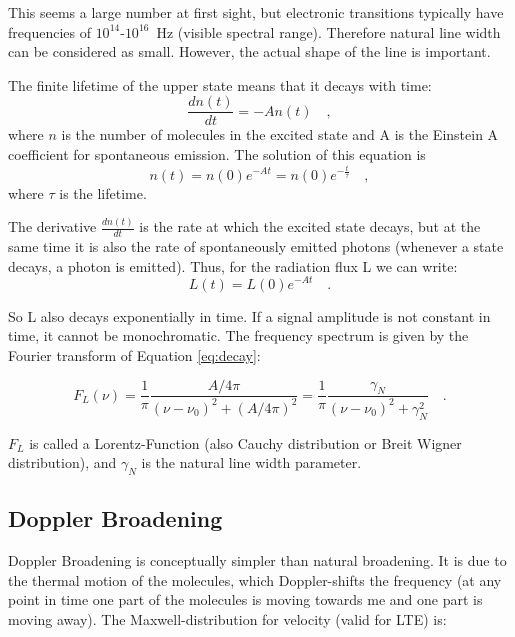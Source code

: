 This seems a large number at first sight, but electronic transitions
typically have frequencies of $10^{14}$-$10^{16}$~Hz (visible spectral
range). Therefore natural line width can be considered as
small. However, the actual shape of the line is important.

The finite lifetime of the upper state means that it decays with time:
\begin{equation}
\frac{dn(t)}{dt} = -A n(t) \quad ,
\end{equation}
where $n$ is the number of molecules in the excited state and A is the
Einstein A coefficient for spontaneous emission. The solution of this
equation is
\begin{equation}
n(t) = n(0) e^{-At} = n(0) e^{-\frac{t}{\tau}} \quad ,
\end{equation}
where $\tau$ is the lifetime. 

The derivative $\frac{dn(t)}{dt}$ is the rate at which
the excited state decays, but at the same time it is also the rate of
spontaneously emitted photons (whenever a state decays, a photon is
emitted). Thus, for the radiation flux L we can write:
\begin{equation}
\label{eq:decay}
L(t) = L(0) e^{-At} \quad .
\end{equation}

So L also decays exponentially in time. If a signal amplitude is not
constant in time, it cannot be monochromatic. The frequency spectrum
is given by the Fourier transform of Equation \ref{eq:decay}:

\begin{equation}
F_{L}(\nu) = \frac{1}{\pi} \frac{A/4\pi}{(\nu - \nu_{0})^{2} +
  (A/4\pi)^{2}} = \frac{1}{\pi} \frac{\gamma_{N}}{(\nu - \nu_{0})^{2}
  + \gamma_{N}^{2}} \quad .
\end{equation}

$F_{L}$ is called a Lorentz-Function (also Cauchy distribution or
Breit Wigner distribution), and $\gamma_{N}$ is the natural line width parameter. 

\subsection{Doppler Broadening}

Doppler Broadening is conceptually simpler than natural broadening. It
is due to the thermal motion of the molecules, which Doppler-shifts
the frequency (at any point in time one part of the molecules is
moving towards me and one part is moving away). The
Maxwell-distribution for velocity (valid for LTE) is:

